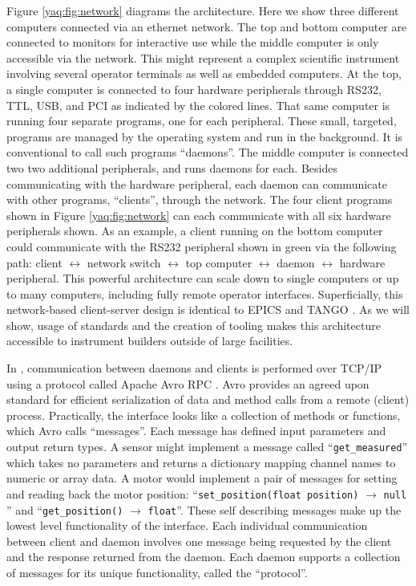 Figure \ref{yaq:fig:network} diagrams the \yaq{} architecture.
Here we show three different computers connected via an ethernet network.
The top and bottom computer are connected to monitors for interactive use while the middle computer is only accessible via the network.
This might represent a complex scientific instrument involving several operator terminals as well as embedded computers.
At the top, a single computer is connected to four hardware peripherals through RS232, TTL, USB, and PCI as indicated by the colored lines.
That same computer is running four separate programs, one for each peripheral.
These small, targeted, programs are managed by the operating system and run in the background.
It is conventional to call such programs ``daemons''\cite{Raymond_1996}.
The middle computer is connected two two additional peripherals, and runs daemons for each.
Besides communicating with the hardware peripheral, each daemon can communicate with other programs, ``clients'',  through the network.
The four client programs shown in Figure \ref{yaq:fig:network} can each communicate with all six hardware peripherals shown.
As an example, a client running on the bottom computer could communicate with the RS232 peripheral shown in green via the following path: client $\leftrightarrow$ network switch $\leftrightarrow$ top computer $\leftrightarrow$ daemon $\leftrightarrow$ hardware peripheral.
This powerful architecture can scale down to single computers or up to many computers, including fully remote operator interfaces.
Superficially, this network-based client-server design is identical to EPICS and TANGO \cite{DalesioLR1991a}\cite{AGotz1999TANGOA}.
As we will show, usage of standards and the creation of tooling makes this architecture accessible to instrument builders outside of large facilities.

In \yaq{}, communication between daemons and clients is performed over TCP/IP using a protocol called Apache Avro RPC \cite{AvroSpecification}.
Avro provides an agreed upon standard for efficient serialization of data and method calls from a remote (client) process.
Practically, the \yaq{} interface looks like a collection of methods or functions, which Avro calls ``messages''.
Each message has defined input parameters and output return types.
A sensor might implement a message called ``\texttt{get\_measured}'' which takes no parameters and returns a dictionary mapping channel names to numeric or array data.
A motor would implement a pair of messages for setting and reading back the motor position: ``\texttt{set\_position(float position)} $\rightarrow$ \texttt{null} '' and ``\texttt{get\_position()} $\rightarrow$ \texttt{float}''.
These self describing messages make up the lowest level functionality of the \yaq{} interface.
Each individual communication between client and daemon involves one message being requested by the client and the response returned from the daemon.
Each daemon supports a collection of messages for its unique functionality, called the ``protocol''.

